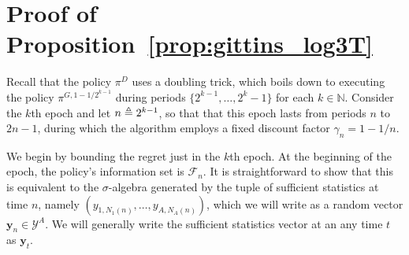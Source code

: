 \section{Proof of Proposition~\ref{prop:gittins_log3T}} \label{proof:prop_log3T}
\begin{myproof}[Proof.]
	Recall that the policy $\pi^D$ uses a doubling trick, which boils down to executing the policy $\pi^{G,1-1/2^{k-1}}$ during periods $\{2^{k-1},\ldots,2^{k}-1\}$ for each $k \in \mathbb{N}$. Consider the $k$th epoch and let $n \triangleq 2^{k-1}$, so that that this epoch lasts from periods $n$ to $2n-1$, during which the algorithm employs a fixed discount factor $\gamma_n = 1-1/n$.
	
	We begin by bounding the regret just in the $k$th epoch. At the beginning of the epoch, the policy's information set is $\mathcal F_n$. It is straightforward to show that this is equivalent to the $\sigma$-algebra generated by the tuple of sufficient statistics at time $n$, namely $(y_{1,N_1(n)}, \ldots, y_{A,N_A(n)})$, which we will write as a random vector $\mathbf y_n \in \mathcal Y^A$. We will generally write the sufficient statistics vector at an any time $t$ as $\mathbf y_t$.
	

\end{myproof}
